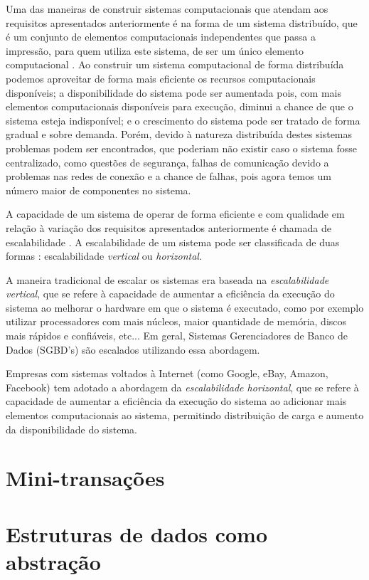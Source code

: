 \documentclass[a4paper,12pt]{report}
\begin{document}
Uma das maneiras de construir sistemas computacionais que atendam aos requisitos apresentados anteriormente é na forma de um sistema distribuído, que é um conjunto de elementos computacionais independentes que passa a impressão, para quem utiliza este sistema, de ser um único elemento computacional \cite{ds-tanenbaum}. Ao construir um sistema computacional de forma distribuída podemos aproveitar de forma mais eficiente os recursos computacionais disponíveis; a disponibilidade do sistema pode ser aumentada pois, com mais elementos computacionais disponíveis para execução, diminui a chance de que o sistema esteja indisponível; e o crescimento do sistema pode ser tratado de forma gradual e sobre demanda. Porém, devido à natureza distribuída destes sistemas problemas podem ser encontrados, que poderiam não existir caso o sistema fosse centralizado, como questões de segurança, falhas de comunicação devido a problemas nas redes de conexão e a chance de falhas, pois agora temos um número maior de componentes no sistema.

A capacidade de um sistema de operar de forma eficiente e com qualidade em relação à variação dos requisitos apresentados anteriormente é chamada de escalabilidade \cite{evaluating-scalability}. A escalabilidade de um sistema pode ser classificada de duas formas \cite{scale-up-vs-down}: escalabilidade {\em vertical} ou {\em horizontal}.

A maneira tradicional de escalar os sistemas era baseada na {\em escalabilidade vertical}, que se refere à capacidade de aumentar a eficiência da execução do sistema ao melhorar o hardware em que o sistema é executado, como por exemplo utilizar processadores com mais núcleos, maior quantidade de memória, discos mais rápidos e confiáveis, etc... Em geral, Sistemas Gerenciadores de Banco de Dados (SGBD's) são escalados utilizando essa abordagem.

Empresas com sistemas voltados à Internet (como Google, eBay, Amazon, Facebook) tem adotado a abordagem da {\em escalabilidade horizontal}, que se refere à capacidade de aumentar a eficiência da execução do sistema ao adicionar mais elementos computacionais ao sistema, permitindo distribuição de carga e aumento da disponibilidade do sistema.
\chapter{Mini-transações}
\chapter{Estruturas de dados como abstração}
\end{document}
